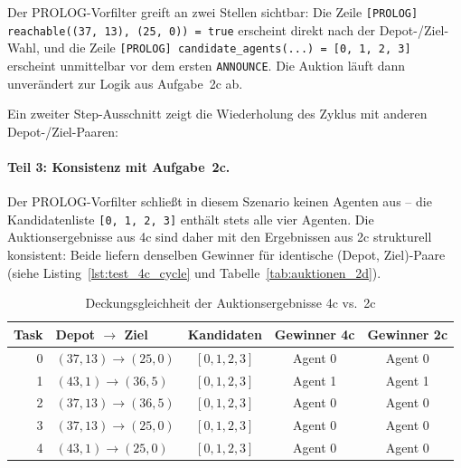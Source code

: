 

Der \acs{PROLOG}-Vorfilter greift an zwei Stellen sichtbar: Die Zeile \texttt{[PROLOG] reachable((37, 13), (25, 0)) = true} erscheint direkt nach der Depot-/Ziel-Wahl, und die Zeile \texttt{[\acs{PROLOG}] candidate\_agents(...) = [0, 1, 2, 3]} erscheint unmittelbar vor dem ersten \texttt{ANNOUNCE}. Die Auktion läuft dann unverändert zur Logik aus Aufgabe~2c ab.

Ein zweiter Step-Ausschnitt zeigt die Wiederholung des Zyklus mit anderen Depot-/Ziel-Paaren:



\paragraph{Teil 3: Konsistenz mit Aufgabe~2c.}
Der \acs{PROLOG}-Vorfilter schließt in diesem Szenario keinen Agenten aus -- die Kandidatenliste \texttt{[0, 1, 2, 3]} enthält stets alle vier Agenten. Die Auktionsergebnisse aus 4c sind daher mit den Ergebnissen aus 2c strukturell konsistent: Beide liefern denselben Gewinner für identische (Depot, Ziel)-Paare (siehe Listing~\ref{lst:test_4c_cycle} und Tabelle~\ref{tab:auktionen_2d}).

\begin{table}[H]
    \centering
    \begin{tabular}{r l c c c}
        \toprule
        \textbf{Task} & \textbf{Depot $\to$ Ziel} & \textbf{Kandidaten} & \textbf{Gewinner 4c} & \textbf{Gewinner 2c} \\
        \midrule
        0 & $(37,13) \to (25,0)$ & $[0,1,2,3]$ & Agent 0 & Agent 0 \\
        1 & $(43,1) \to (36,5)$  & $[0,1,2,3]$ & Agent 1 & Agent 1 \\
        2 & $(37,13) \to (36,5)$ & $[0,1,2,3]$ & Agent 0 & Agent 0 \\
        3 & $(37,13) \to (25,0)$ & $[0,1,2,3]$ & Agent 0 & Agent 0 \\
        4 & $(43,1) \to (25,0)$  & $[0,1,2,3]$ & Agent 0 & Agent 0 \\
        \bottomrule
    \end{tabular}
    \caption{Deckungsgleichheit der Auktionsergebnisse 4c vs.\ 2c}
    \label{tab:prolog_4c_consistency}
\end{table}

